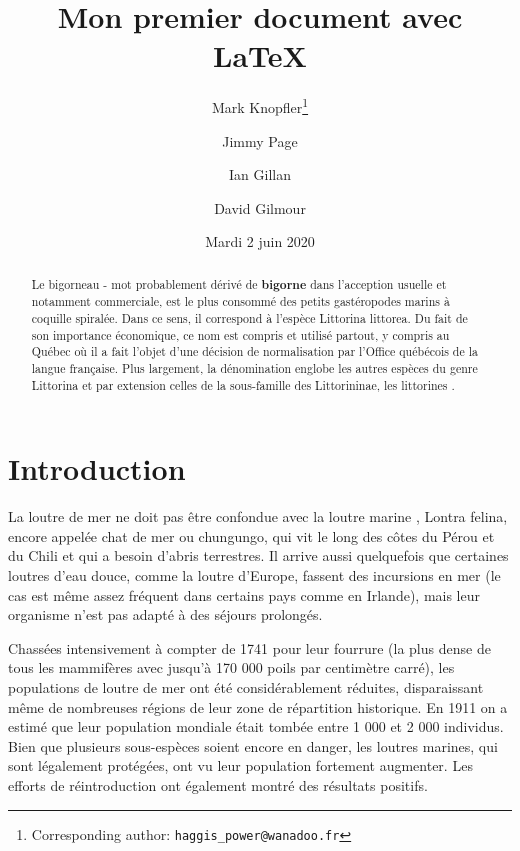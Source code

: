 \documentclass[a4paper, twoside]{article}
\title{Mon premier document avec \LaTeX} %
\author[,1]{Mark Knopfler\thanks{Corresponding author: \texttt{haggis\_power@wanadoo.fr}}}
\author[2,3]{Jimmy Page}
\author[,2]{Ian Gillan}
\author[,3]{David Gilmour}
\affil[1]{University of Glasgow, Scotland, United Kingdom}
\affil[2]{Imperial College London, London, England, United Kingdom}
\affil[3]{University of Cambridge, England, United Kingdom}
\date{Mardi 2 juin 2020}
\begin{document}
\maketitle %


\begin{abstract}
Le bigorneau - mot probablement dérivé de \textbf{bigorne} dans l'acception usuelle et notamment commerciale, est le plus consommé des petits gastéropodes marins à coquille spiralée. Dans ce sens, il correspond à l'espèce Littorina littorea. Du fait de son importance économique, ce nom est compris et utilisé partout, y compris au Québec où il a fait l'objet d'une décision de normalisation par l'Office québécois de la langue française. Plus largement, la dénomination englobe les autres espèces du genre Littorina et par extension celles de la sous-famille des Littorininae, les \og littorines \fg. 
\end{abstract}

\tableofcontents %

\section*{Introduction} %

La loutre de mer ne doit pas être confondue avec la \og loutre marine \fg, Lontra felina, encore appelée chat de mer ou chungungo, qui vit le long des côtes du Pérou et du Chili et qui a besoin d'abris terrestres. 
Il arrive aussi quelquefois que certaines loutres d'eau douce, comme la loutre d'Europe, fassent des incursions en mer (le cas est même assez fréquent dans certains pays comme en Irlande), mais leur organisme n'est pas adapté à des séjours prolongés. 

Chassées intensivement à compter de 1741 pour leur fourrure (la plus dense de tous les mammifères avec jusqu'à 170 000 poils par centimètre carré), les populations de loutre de mer ont été considérablement réduites, disparaissant même de nombreuses régions de leur zone de répartition historique. 
En 1911 on a estimé que leur population mondiale était tombée entre 1 000 et 2 000 individus. 
Bien que plusieurs sous-espèces soient encore en danger, les loutres marines, qui sont légalement protégées, ont vu leur population fortement augmenter. Les efforts de réintroduction ont également montré des résultats positifs.
\end{document}
